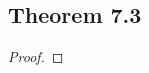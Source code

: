 \documentclass[../../main.tex]{subfiles}
\begin{document}
\subsection{Theorem 7.3}
\begin{wts}

\end{wts}
\begin{proof}

\end{proof}
\end{document}
